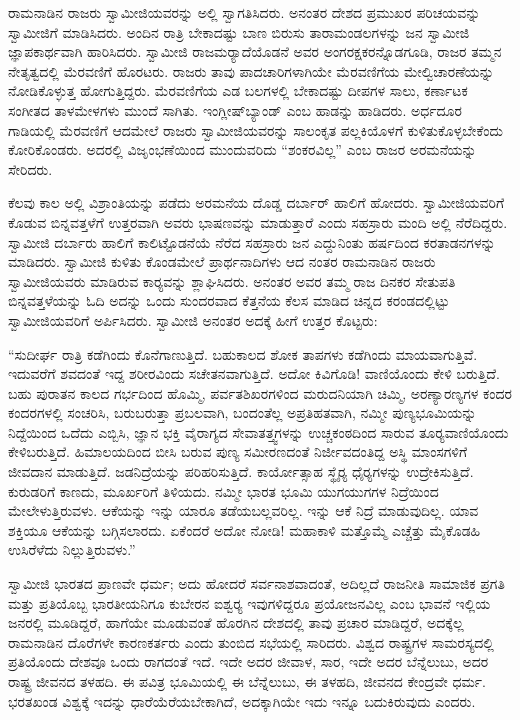  ರಾಮನಾಡಿನ ರಾಜರು ಸ್ವಾಮೀಜಿಯವರನ್ನು ಅಲ್ಲಿ ಸ್ವಾಗತಿಸಿದರು. ಅನಂತರ ದೇಶದ ಪ್ರಮುಖರ ಪರಿಚಯವನ್ನು ಸ್ವಾಮೀಜಿಗೆ ಮಾಡಿಸಿದರು. ಅಂದಿನ ರಾತ್ರಿ ಬೇಕಾದಷ್ಟು ಬಾಣ ಬಿರುಸು ತಾರಾಮಂಡಲಗಳನ್ನು ಜನ ಸ್ವಾಮೀಜಿ ಜ್ಞಾಪಕಾರ್ಥವಾಗಿ ಹಾರಿಸಿದರು. ಸ್ವಾಮೀಜಿ ರಾಜಮರ‍್ಯಾದೆಯೊಡನೆ ಅವರ ಅಂಗರಕ್ಷಕರನ್ನೊಡಗೂಡಿ, ರಾಜರ ತಮ್ಮನ ನೇತೃತ್ವದಲ್ಲಿ ಮೆರವಣಿಗೆ ಹೊರಟರು. ರಾಜರು ತಾವು ಪಾದಚಾರಿಗಳಾಗಿಯೇ ಮೆರವಣಿಗೆಯ ಮೇಲ್ವಿಚಾರಣೆಯನ್ನು ನೋಡಿಕೊಳ್ಳುತ್ತ ಹೋಗುತ್ತಿದ್ದರು. ಮೆರವಣಿಗೆಯ ಎಡ ಬಲಗಳಲ್ಲಿ ಬೇಕಾದಷ್ಟು ದೀಪಗಳ ಸಾಲು, ಕರ್ಣಾಟಕ ಸಂಗೀತದ ತಾಳಮೇಳಗಳು ಮುಂದೆ ಸಾಗಿತು. ಇಂಗ್ಲೀಷ್‌ಬ್ಯಾಂಡ್  ಎಂಬ ಹಾಡನ್ನು ಹಾಡಿದರು. ಅರ್ಧದೂರ ಗಾಡಿಯಲ್ಲಿ ಮೆರವಣಿಗೆ ಆದಮೇಲೆ ರಾಜರು ಸ್ವಾಮೀಜಿಯವರನ್ನು ಸಾಲಂಕೃತ ಪಲ್ಲಕಿಯೊಳಗೆ ಕುಳಿತುಕೊಳ್ಳಬೇಕೆಂದು ಕೋರಿಕೊಂಡರು. ಅದರಲ್ಲಿ ವಿಜೃಂಭಣೆಯಿಂದ ಮುಂದುವರಿದು “ಶಂಕರವಿಲ್ಲ” ಎಂಬ ರಾಜರ ಅರಮನೆಯನ್ನು ಸೇರಿದರು. 

 ಕೆಲವು ಕಾಲ ಅಲ್ಲಿ ವಿಶ್ರಾಂತಿಯನ್ನು ಪಡೆದು ಅರಮನೆಯ ದೊಡ್ಡ ದರ್ಬಾರ್ ಹಾಲಿಗೆ ಹೋದರು. ಸ್ವಾಮೀಜಿಯವರಿಗೆ ಕೊಡುವ ಬಿನ್ನವತ್ತಳೆಗೆ ಉತ್ತರವಾಗಿ ಅವರು ಭಾಷಣವನ್ನು ಮಾಡುತ್ತಾರೆ ಎಂದು ಸಹಸ್ರಾರು ಮಂದಿ ಅಲ್ಲಿ ನೆರೆದಿದ್ದರು. ಸ್ವಾಮೀಜಿ ದರ್ಬಾರು ಹಾಲಿಗೆ ಕಾಲಿಟ್ಟೊಡನೆಯೆ ನೆರೆದ ಸಹಸ್ರಾರು ಜನ ಎದ್ದುನಿಂತು ಹರ್ಷದಿಂದ ಕರತಾಡನಗಳನ್ನು ಮಾಡಿದರು. ಸ್ವಾಮೀಜಿ ಕುಳಿತು ಕೊಂಡಮೇಲೆ ಪ್ರಾರ್ಥನಾದಿಗಳು ಆದ ನಂತರ ರಾಮನಾಡಿನ ರಾಜರು ಸ್ವಾಮೀಜಿಯವರು ಮಾಡಿರುವ ಕಾರ‍್ಯವನ್ನು ಶ್ಲಾಘಿಸಿದರು. ಅನಂತರ ಅವರ ತಮ್ಮ ರಾಜ ದಿನಕರ ಸೇತುಪತಿ ಬಿನ್ನವತ್ತಳೆಯನ್ನು ಓದಿ ಅದನ್ನು ಒಂದು ಸುಂದರವಾದ ಕೆತ್ತನೆಯ ಕೆಲಸ ಮಾಡಿದ ಚಿನ್ನದ ಕರಂಡದಲ್ಲಿಟ್ಟು ಸ್ವಾಮೀಜಿಯವರಿಗೆ ಅರ್ಪಿಸಿದರು. ಸ್ವಾಮೀಜಿ ಅನಂತರ ಅದಕ್ಕೆ ಹೀಗೆ ಉತ್ತರ ಕೊಟ್ಟರು: 

\vskip 2pt

 “ಸುದೀರ್ಘ ರಾತ್ರಿ ಕಡೆಗಿಂದು ಕೊನೆಗಾಣುತ್ತಿದೆ. ಬಹುಕಾಲದ ಶೋಕ ತಾಪಗಳು ಕಡೆಗಿಂದು ಮಾಯವಾಗುತ್ತಿವೆ. ಇದುವರೆಗೆ ಶವದಂತೆ ಇದ್ದ ಶರೀರವಿಂದು ಸಚೇತನವಾಗುತ್ತಿದೆ. ಅದೋ ಕಿವಿಗೊಡಿ! ವಾಣಿಯೊಂದು ಕೇಳಿ ಬರುತ್ತಿದೆ. ಬಹು ಪುರಾತನ ಕಾಲದ ಗರ್ಭದಿಂದ ಹೊಮ್ಮಿ, ಪರ್ವತಶಿಖರಗಳಿಂದ ಮರುದನಿಯಾಗಿ ಚಿಮ್ಮಿ, ಅರಣ್ಯಾರಣ್ಯಗಳ ಕಂದರ ಕಂದರಗಳಲ್ಲಿ ಸಂಚರಿಸಿ, ಬರುಬರುತ್ತಾ ಪ್ರಬಲವಾಗಿ, ಬಂದಂತೆಲ್ಲ ಅಪ್ರತಿಹತವಾಗಿ, ನಮ್ಮೀ ಪುಣ್ಯಭೂಮಿಯನ್ನು ನಿದ್ದೆಯಿಂದ ಒದೆದು ಎಬ್ಬಿಸಿ, ಜ್ಞಾನ ಭಕ್ತಿ ವೈರಾಗ್ಯದ ಸೇವಾತತ್ತ್ವಗಳನ್ನು ಉಚ್ಚಕಂಠದಿಂದ ಸಾರುವ ತೂರ‍್ಯವಾಣಿಯೊಂದು ಕೇಳಿಬರುತ್ತಿದೆ. ಹಿಮಾಲಯದಿಂದ ಬೀಸಿ ಬರುವ ಪುಣ್ಯ ಸಮೀರಣದಂತೆ ನಿರ್ಜೀವದಂತಿದ್ದ ಅಸ್ಥಿ ಮಾಂಸಗಳಿಗೆ ಜೀವದಾನ ಮಾಡುತ್ತಿದೆ. ಜಡನಿದ್ರೆಯನ್ನು ಪರಿಹರಿಸುತ್ತಿದೆ. ಕಾರ್ಯೋತ್ಸಾಹ ಸ್ಥೈರ‍್ಯ ಧೈರ‍್ಯಗಳನ್ನು ಉದ್ರೇಕಿಸುತ್ತಿದೆ. ಕುರುಡರಿಗೆ ಕಾಣದು, ಮೂರ್ಖರಿಗೆ ತಿಳಿಯದು. ನಮ್ಮೀ ಭಾರತ ಭೂಮಿ ಯುಗಯುಗಗಳ ನಿದ್ರೆಯಿಂದ ಮೇಲೇಳುತ್ತಿರುವಳು. ಆಕೆಯನ್ನು ಇನ್ನು ಯಾರೂ ತಡೆಯಬಲ್ಲವರಿಲ್ಲ. ಇನ್ನು ಆಕೆ ನಿದ್ರೆ ಮಾಡುವುದಿಲ್ಲ. ಯಾವ ಶಕ್ತಿಯೂ ಆಕೆಯನ್ನು ಬಗ್ಗಿಸಲಾರದು. ಏಕೆಂದರೆ ಅದೋ ನೋಡಿ! ಮಹಾಕಾಳಿ ಮತ್ತೊಮ್ಮೆ ಎಚ್ಚೆತ್ತು ಮೈಕೊಡಹಿ ಉಸಿರೆಳೆದು ನಿಲ್ಲುತ್ತಿರುವಳು.” 

\vskip 2pt

 ಸ್ವಾಮೀಜಿ ಭಾರತದ ಪ್ರಾಣವೇ ಧರ್ಮ; ಅದು ಹೋದರೆ ಸರ್ವನಾಶವಾದಂತೆ, ಅದಿಲ್ಲದೆ ರಾಜನೀತಿ ಸಾಮಾಜಿಕ ಪ್ರಗತಿ ಮತ್ತು ಪ್ರತಿಯೊಬ್ಬ ಭಾರತೀಯನಿಗೂ ಕುಬೇರನ ಐಶ್ವರ‍್ಯ ಇವುಗಳಿದ್ದರೂ ಪ್ರಯೋಜನವಿಲ್ಲ ಎಂಬ ಭಾವನೆ ಇಲ್ಲಿಯ ಜನರಲ್ಲಿ ಮೂಡಿದ್ದರೆ, ಹಾಗೆಯೇ ಮೂಡುವಂತೆ ಹೊರಗಿನ ದೇಶದಲ್ಲಿ ತಾವು ಪ್ರಚಾರ ಮಾಡಿದ್ದರೆ, ಅದಕ್ಕೆಲ್ಲ ರಾಮನಾಡಿನ ದೊರೆಗಳೇ ಕಾರಣಕರ್ತರು ಎಂದು ತುಂಬಿದ ಸಭೆಯಲ್ಲಿ ಸಾರಿದರು. ವಿಶ್ವದ ರಾಷ್ಟ್ರಗಳ ಸಾಮರಸ್ಯದಲ್ಲಿ ಪ್ರತಿಯೊಂದು ದೇಶವೂ ಒಂದು ರಾಗದಂತೆ ಇದೆ. ಇದೇ ಅದರ ಜೀವಾಳ, ಸಾರ, ಇದೇ ಅದರ ಬೆನ್ನೆಲುಬು, ಅದರ ರಾಷ್ಟ್ರ ಜೀವನದ ತಳಹದಿ. ಈ ಪವಿತ್ರ ಭೂಮಿಯಲ್ಲಿ ಈ ಬೆನ್ನೆಲುಬು, ಈ ತಳಹದಿ, ಜೀವನದ ಕೇಂದ್ರವೇ ಧರ್ಮ. ಭರತಖಂಡ ವಿಶ್ವಕ್ಕೆ ಇದನ್ನು ಧಾರೆಯೆರೆಯಬೇಕಾಗಿದೆ, ಅದಕ್ಕಾಗಿಯೇ ಇದು ಇನ್ನೂ ಬದುಕಿರುವುದು ಎಂದರು. 

